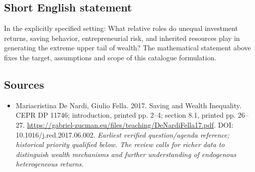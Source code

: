\documentclass[11pt]{article}
\begin{document}
\subsection{Short English statement}
In the explicitly specified setting: What relative roles do unequal investment returns, saving behavior, entrepreneurial risk, and inherited resources play in generating the extreme upper tail of wealth? The mathematical statement above fixes the target, assumptions and scope of this catalogue formulation.

\subsection{Sources}
\begin{itemize}\raggedright
\item[\textnormal{[S1]}]\hypertarget{source:30007644:1}{} Mariacristina De Nardi, Giulio Fella. 2017. Saving and Wealth Inequality. CEPR DP 11746; introduction, printed pp. 2–4; section 8.1, printed pp. 26–27.
\url{https://gabriel-zucman.eu/files/teaching/DeNardiFella17.pdf}.
DOI: 10.1016/j.red.2017.06.002.
{\small\textit{Earliest verified question/agenda reference; historical priority qualified below. The review calls for richer data to distinguish wealth mechanisms and further understanding of endogenous heterogeneous returns.}}
\end{itemize}
\end{document}
